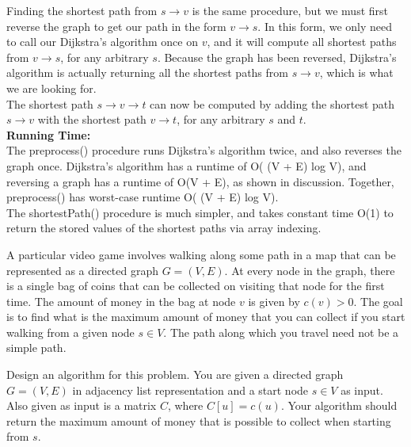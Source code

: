 \documentclass{exam}
\begin{document}
\begin{questions}
Finding the shortest path from $s \rightarrow v$ is the same procedure, but we must first reverse the graph to get our path in the form $v \rightarrow s$. In this form, we only need to call our Dijkstra's algorithm once on $v$, and it will compute all shortest paths from $v \rightarrow s$, for any arbitrary $s$. Because the graph has been reversed, Dijkstra's algorithm is actually returning all the shortest paths from $s \rightarrow v$, which is what we are looking for.\\

The shortest path $s \rightarrow v \rightarrow t$ can now be computed by adding the shortest path $s \rightarrow v$ with the shortest path $v \rightarrow t$, for any arbitrary $s$ and $t$.\\

{\bf Running Time:}\\
The preprocess() procedure runs Dijkstra's algorithm twice, and also reverses the graph once. Dijkstra's algorithm has a runtime of O( (V + E) log V), and reversing a graph has a runtime of O(V + E), as shown in discussion. Together, preprocess() has worst-case runtime O( (V + E) log V).\\

The shortestPath() procedure is much simpler, and takes constant time O(1) to return the stored values of the shortest paths via array indexing.\\

\newpage



\question A particular  video game involves walking along some path in a map that can be represented as a directed graph $G = (V, E)$. 
At every node in the graph, there is a single bag of coins that can be collected on visiting that node for the first time. 
The amount of money in the bag at node $v$ is given by $c(v) > 0$.
The goal is to find what is the maximum amount of money that you can collect if you start walking from a given node $s \in V$.
The path along which you travel need not be a simple path. 

Design an algorithm for this problem. You are given a directed graph $G = (V, E)$ in adjacency list representation and a start node $s \in V$ as input. 
Also given as input is a matrix $C$, where $C[u] = c(u)$.
Your algorithm should return the maximum amount of money that is possible to collect when starting from $s$.
\end{questions}
\end{document}
